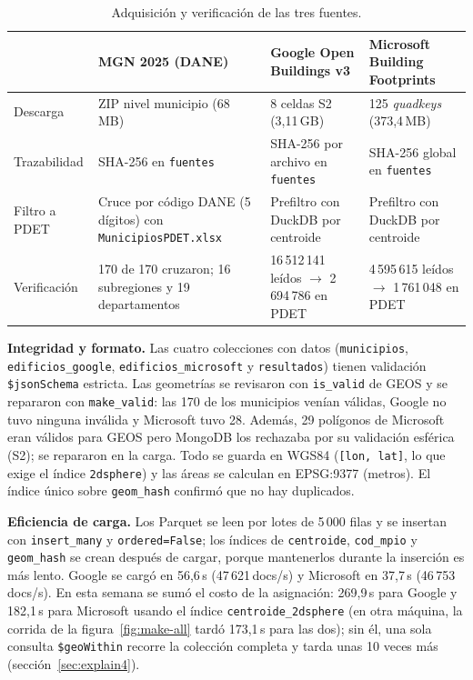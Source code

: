 \documentclass[11pt,a4paper]{article}
\newcommand{\campo}[1]{\texttt{#1}}
\begin{document}
\begin{table}[H]
  \centering\small
  \caption{Adquisición y verificación de las tres fuentes.}
  \label{tab:adquisicion}
  \begin{tabularx}{\textwidth}{@{}p{2.6cm} L L L@{}}
    \toprule
    & \textbf{MGN 2025 (DANE)} & \textbf{Google Open Buildings v3} & \textbf{Microsoft Building Footprints} \\
    \midrule
    Descarga & ZIP nivel municipio (68\,MB) & 8 celdas S2 (3,11\,GB) & 125 \emph{quadkeys} (373,4\,MB) \\
    Trazabilidad & SHA-256 en \campo{fuentes} & SHA-256 por archivo en \campo{fuentes} & SHA-256 global en \campo{fuentes} \\
    Filtro a PDET & Cruce por código DANE (5 dígitos) con \campo{MunicipiosPDET.xlsx} & Prefiltro con DuckDB por centroide & Prefiltro con DuckDB por centroide \\
    Verificación & 170 de 170 cruzaron; 16 subregiones y 19 departamentos & 16\,512\,141 leídos $\rightarrow$ 2\,694\,786 en PDET & 4\,595\,615 leídos $\rightarrow$ 1\,761\,048 en PDET \\
    \bottomrule
  \end{tabularx}
\end{table}

\textbf{Integridad y formato.} Las cuatro colecciones con datos
(\campo{municipios}, \campo{edificios\_google}, \campo{edificios\_microsoft} y
\campo{resultados}) tienen validación \campo{\$jsonSchema} estricta. Las
geometrías se revisaron con \campo{is\_valid} de GEOS y se repararon con
\campo{make\_valid}: las 170 de los municipios venían válidas, Google no tuvo
ninguna inválida y Microsoft tuvo 28. Además, 29 polígonos de Microsoft eran
válidos para GEOS pero MongoDB los rechazaba por su validación esférica (S2);
se repararon en la carga. Todo se guarda en WGS84 (\campo{[lon, lat]}, lo que
exige el índice \campo{2dsphere}) y las áreas se calculan en EPSG:9377 (metros).
El índice único sobre \campo{geom\_hash} confirmó que no hay duplicados.

\textbf{Eficiencia de carga.} Los Parquet se leen por lotes de 5\,000 filas y
se insertan con \campo{insert\_many} y \campo{ordered=False}; los índices de
\campo{centroide}, \campo{cod\_mpio} y \campo{geom\_hash} se crean después de
cargar, porque mantenerlos durante la inserción es más lento. Google se cargó
en 56,6\,s (47\,621\,docs/s) y Microsoft en 37,7\,s (46\,753\,docs/s). En esta
semana se sumó el costo de la asignación: 269,9\,s para Google y 182,1\,s para
Microsoft usando el índice \campo{centroide\_2dsphere} (en otra máquina, la
corrida de la figura~\ref{fig:make-all} tardó 173,1\,s para las dos); sin él, una sola
consulta \campo{\$geoWithin} recorre la colección completa y tarda unas 10
veces más (sección~\ref{sec:explain4}).
\end{document}
